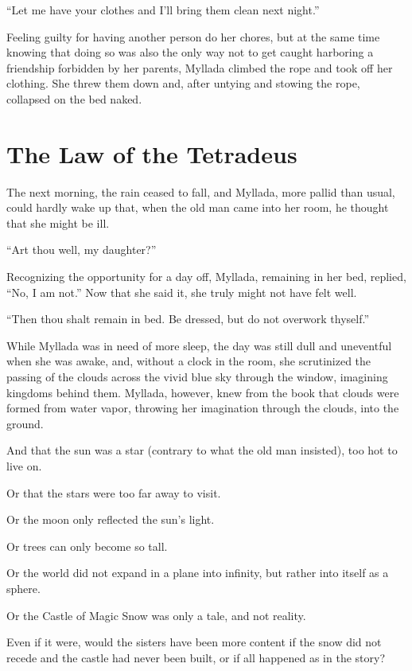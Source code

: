 ``Let me have your clothes and I'll bring them clean next night.''

Feeling guilty for having another person do her chores, but at the same time knowing that doing so was also the only way not to get caught harboring a friendship forbidden by her parents, Myllada climbed the rope and took off her clothing. She threw them down and, after untying and stowing the rope, collapsed on the bed naked.

\chapter{The Law of the Tetradeus}

The next morning, the rain ceased to fall, and Myllada, more pallid than usual, could hardly wake up that, when the old man came into her room, he thought that she might be ill.

``Art thou well, my daughter?''

Recognizing the opportunity for a day off, Myllada, remaining in her bed, replied, ``No, I am not.'' Now that she said it, she truly might not have felt well.

``Then thou shalt remain in bed. Be dressed, but do not overwork thyself.''

\centeredstars

While Myllada was in need of more sleep, the day was still dull and uneventful when she was awake, and, without a clock in the room, she scrutinized the passing of the clouds across the vivid blue sky through the window, imagining kingdoms behind them. Myllada, however, knew from the book that clouds were formed from water vapor, throwing her imagination through the clouds, into the ground.

And that the sun was a star (contrary to what the old man insisted), too hot to live on.

Or that the stars were too far away to visit.

Or the moon only reflected the sun's light.

Or trees can only become so tall.

Or the world did not expand in a plane into infinity, but rather into itself as a sphere.

Or the Castle of Magic Snow was only a tale, and not reality.

Even if it were, would the sisters have been more content if the snow did not recede and the castle had never been built, or if all happened as in the story?


